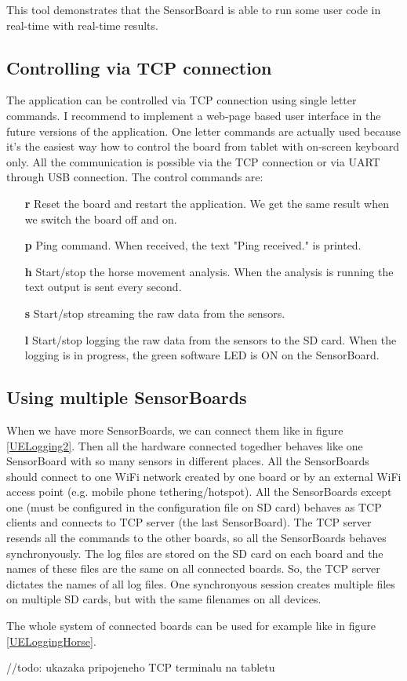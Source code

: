 This tool demonstrates that the SensorBoard is able to run some user code in real-time with real-time results.

\subsection{Controlling via TCP connection}
The application can be controlled via TCP connection using single letter commands. I recommend to implement a web-page based user interface in the future versions of the application. One letter commands are actually used because it's the easiest way how to control the board from tablet with on-screen keyboard only. All the communication is possible via the TCP connection or via UART through USB connection. The control commands are:

\begin{itemize}
	\item[\textbf{r}] Reset the board and restart the application. We get the same result when we switch the board off and on.
	\item[\textbf{p}] Ping command. When received, the text "Ping received." is printed.
	\item[\textbf{h}] Start/stop the horse movement analysis. When the analysis is running the text output is sent every second.
	\item[\textbf{s}] Start/stop streaming the raw data from the sensors.
	\item[\textbf{l}] Start/stop logging the raw data from the sensors to the SD card. When the logging is in progress, the green software LED is ON on the SensorBoard.
\end{itemize}

\subsection{Using multiple SensorBoards}
When we have more SensorBoards, we can connect them like in figure \ref{UELogging2}. Then all the hardware connected togedher behaves like one SensorBoard with so many sensors in different places. All the SensorBoards should connect to one WiFi network created by one board or by an external WiFi access point (e.g. mobile phone tethering/hotspot). All the SensorBoards except one (must be configured in the configuration file on SD card) behaves as TCP clients and connects to TCP server (the last SensorBoard). The TCP server resends all the commands to the other boards, so all the SensorBoards behaves synchronyously. The log files are stored on the SD card on each board and the names of these files are the same on all connected boards. So, the TCP server dictates the names of all log files. One synchronyous session creates multiple files on multiple SD cards, but with the same filenames on all devices.

The whole system of connected boards can be used for example like in figure \ref{UELoggingHorse}.

//todo: ukazaka pripojeneho TCP terminalu na tabletu